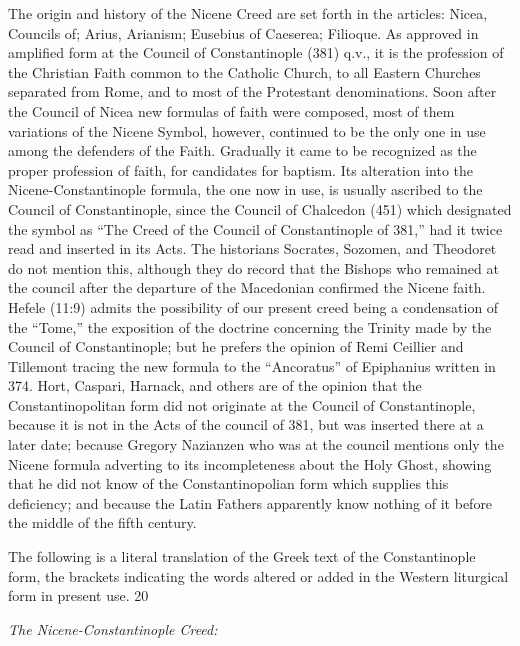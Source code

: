The origin and history of the Nicene Creed are set forth in the articles: Nicea, Councils of;
Arius, Arianism; Eusebius of Caeserea; Filioque. As approved in amplified form at the
Council of Constantinople (381) q.v., it is the profession of the Christian Faith common to
the Catholic Church, to all Eastern Churches separated from Rome, and to most of the
Protestant denominations. Soon after the Council of Nicea new formulas of faith were
composed, most of them variations of the Nicene Symbol, however, continued to be the only
one in use among the defenders of the Faith. Gradually it came to be recognized as the proper
profession of faith, for candidates for baptism. Its alteration into the Nicene-Constantinople
formula, the one now in use, is usually ascribed to the Council of Constantinople, since the
Council of Chalcedon (451) which designated the symbol as ``The Creed of the Council of
Constantinople of 381,'' had it twice read and inserted in its Acts. The historians Socrates,
Sozomen, and Theodoret do not mention this, although they do record that the Bishops who
remained at the council after the departure of the Macedonian confirmed the Nicene faith.
Hefele (11:9) admits the possibility of our present creed being a condensation of the ``Tome,''
the exposition of the doctrine concerning the Trinity made by the Council of Constantinople;
but he prefers the opinion of Remi Ceillier and Tillemont tracing the new formula to the
``Ancoratus'' of Epiphanius written in 374. Hort, Caspari, Harnack, and others are of the
opinion that the Constantinopolitan form did not originate at the Council of Constantinople,
because it is not in the Acts of the council of 381, but was inserted there at a later date;
because Gregory Nazianzen who was at the council mentions only the Nicene formula
adverting to its incompleteness about the Holy Ghost, showing that he did not know of the
Constantinopolian form which supplies this deficiency; and because the Latin Fathers
apparently know nothing of it before the middle of the fifth century.

The following is a literal translation of the Greek text of the Constantinople form, the
brackets indicating the words altered or added in the Western liturgical form in present use.
20

\textit{The Nicene-Constantinople Creed:}

